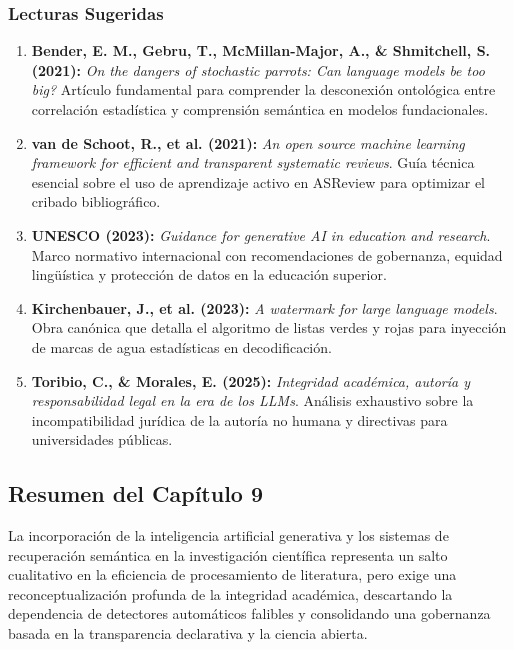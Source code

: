 \subsubsection*{Lecturas Sugeridas}
\begin{enumerate}[leftmargin=1.5em, itemsep=0.12cm]
    \item \textbf{Bender, E. M., Gebru, T., McMillan-Major, A., \& Shmitchell, S. (2021):} \textit{On the dangers of stochastic parrots: Can language models be too big?} Artículo fundamental para comprender la desconexión ontológica entre correlación estadística y comprensión semántica en modelos fundacionales.
    \item \textbf{van de Schoot, R., et al. (2021):} \textit{An open source machine learning framework for efficient and transparent systematic reviews}. Guía técnica esencial sobre el uso de aprendizaje activo en ASReview para optimizar el cribado bibliográfico.
    \item \textbf{UNESCO (2023):} \textit{Guidance for generative AI in education and research}. Marco normativo internacional con recomendaciones de gobernanza, equidad lingüística y protección de datos en la educación superior.
    \item \textbf{Kirchenbauer, J., et al. (2023):} \textit{A watermark for large language models}. Obra canónica que detalla el algoritmo de listas verdes y rojas para inyección de marcas de agua estadísticas en decodificación.
    \item \textbf{Toribio, C., \& Morales, E. (2025):} \textit{Integridad académica, autoría y responsabilidad legal en la era de los LLMs}. Análisis exhaustivo sobre la incompatibilidad jurídica de la autoría no humana y directivas para universidades públicas.
\end{enumerate}

\newpage
{}
\subsection*{Resumen del Capítulo 9}

La incorporación de la inteligencia artificial generativa y los sistemas de recuperación semántica en la investigación científica representa un salto cualitativo en la eficiencia de procesamiento de literatura, pero exige una reconceptualización profunda de la integridad académica, descartando la dependencia de detectores automáticos falibles y consolidando una gobernanza basada en la transparencia declarativa y la ciencia abierta.

